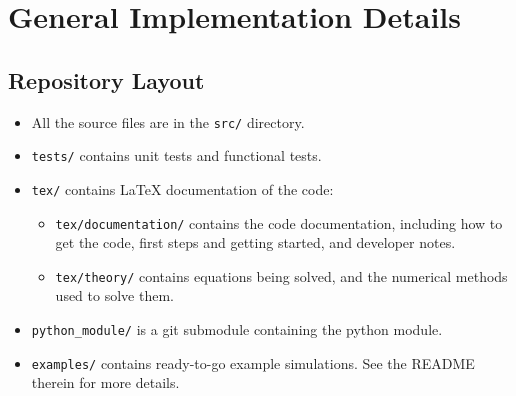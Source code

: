 \newpage
\section{General Implementation Details}



\subsection{Repository Layout}

\begin{itemize} 

    \item All the source files are in the \verb|src/| directory.

    \item \verb|tests/| contains unit tests and functional tests.
	
    \item \verb|tex/| contains LaTeX documentation of the code:

    \begin{itemize}
        \item   \verb|tex/documentation/| contains the code documentation,
                including how to get the code, first steps and getting started,
                and developer notes.

        \item   \verb|tex/theory/| contains equations being solved, and the
                numerical methods used to solve them.

    \end{itemize}

    \item \verb|python_module/| is a git submodule containing the
                \mhutils python module.

    \item \verb|examples/| contains ready-to-go example simulations. See the
                README therein for more details.

\end{itemize}








